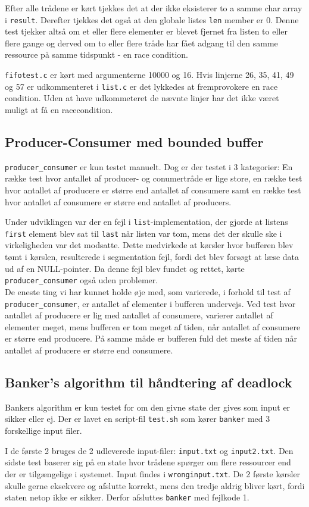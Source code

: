 Efter alle trådene er kørt tjekkes det at der ikke eksisterer to a samme char array i \texttt{result}. Derefter tjekkes det også at den globale listes \texttt{len} member er 0. Denne test tjekker altså om et eller flere elementer er blevet fjernet fra listen to eller flere gange og derved om to eller flere tråde har fået adgang til den samme ressource på samme tidspunkt - en race condition.

\texttt{fifotest.c} er kørt med argumenterne 10000 og 16. Hvis linjerne 26, 35, 41, 49 og 57 er udkommenteret i \texttt{list.c} er det lykkedes at fremprovokere en race condition. Uden at have udkommeteret de nævnte linjer har det ikke været muligt at få en racecondition.

\subsection{Producer-Consumer med bounded buffer}
\texttt{producer\_consumer} er kun testet manuelt. Dog er der testet i 3 kategorier: En række test hvor antallet af producer- og conumertråde er lige store, en række test hvor antallet af producere er større end antallet af consumere samt en række test hvor antallet af consumere er større end antallet af producers.

Under udviklingen var der en fejl i \texttt{list}-implementation, der gjorde at listens \texttt{first} element blev sat til \texttt{last} når listen var tom, mens det der skulle ske i virkeligheden var det modsatte. Dette medvirkede at kørsler hvor bufferen blev tømt i kørslen, resulterede i segmentation fejl, fordi det blev forsøgt at læse data ud af en NULL-pointer. Da denne fejl blev fundet og rettet, kørte \texttt{producer\_consumer} også uden problemer.\\

De eneste ting vi har kunnet holde øje med, som varierede, i forhold til test af \texttt{producer\_consumer}, er antallet af elementer i bufferen undervejs. Ved test hvor antallet af producere er lig med antallet af consumere, varierer antallet af elementer meget, mens bufferen er tom meget af tiden, når antallet af consumere er større end producere. På samme måde er bufferen fuld det meste af tiden når antallet af producere er større end consumere.

\subsection{Banker's algorithm til håndtering af deadlock}
Bankers algorithm er kun testet for om den givne state der gives som input er sikker eller ej. Der er lavet en script-fil \texttt{test.sh} som kører \texttt{banker} med 3 forskellige input filer.

I de første 2 bruges de 2 udleverede input-filer: \texttt{input.txt} og \texttt{input2.txt}. Den sidste test baserer sig på en state hvor trådene spørger om flere ressourcer end der er tilgængelige i systemet. Input findes i \texttt{wronginput.txt}. De 2 første kørsler skulle gerne eksekvere og afslutte korrekt, mens den tredje aldrig bliver kørt, fordi staten netop ikke er sikker. Derfor afsluttes \texttt{banker} med fejlkode 1.